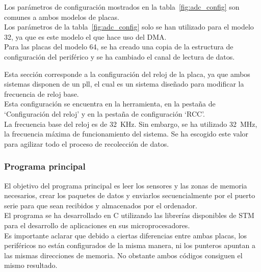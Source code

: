 \documentclass[spanish]{template/minim}
\newcommand{\dataelem}[1]{
    \noindent\textit{{\color{accent}{#1}}}
}
\begin{document}
Los parámetros de configuración mostrados en la tabla~\ref{fig:adc_config} son comunes a ambos modelos de placas.\\

Los parámetros de la tabla~\ref{fig:adc_config} solo se han utilizado para el modelo 32, ya que es este modelo el que hace uso del DMA.\\

Para las placas del modelo 64, se ha creado una copia de la estructura de configuración del periférico y se ha cambiado el canal de lectura de datos.\\

\dataelem{RCC}

Esta sección corresponde a la configuración del reloj de la placa, ya que ambos sistemas disponen de un \gls{pll}, el cual es un sistema diseñado para modificar la frecuencia de reloj base.\\

Esta configuración se encuentra en la herramienta, en la pestaña de `Configuración del reloj' y en la pestaña de configuración `RCC'.\\

La frecuencia base del reloj es de 32~KHz. Sin embargo, se ha utilizado 32~MHz, la frecuencia máxima de funcionamiento del sistema. Se ha escogido este valor para agilizar todo el proceso de recolección de datos.\\


\subsubsection{Programa principal}\label{sec:main_program}

El objetivo del programa principal es leer los sensores y las zonas de memoria necesarios, crear los paquetes de datos y enviarlos secuencialmente por el puerto serie para que sean recibidos y almacenados por el ordenador.\\

El programa se ha desarrollado en C utilizando las librerías disponibles de STM para el desarrollo de aplicaciones en sus microprocesadores.\\

Es importante aclarar que debido a ciertas diferencias entre ambas placas, los periféricos no están configurados de la misma manera, ni los punteros apuntan a las mismas direcciones de memoria. No obstante ambos códigos consiguen el mismo resultado.\\
\end{document}
